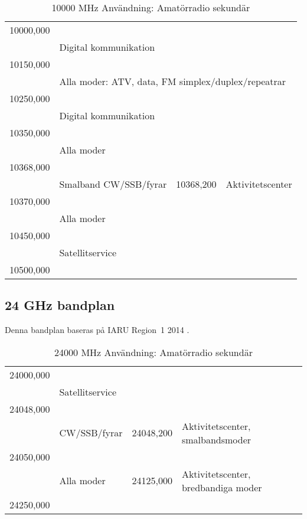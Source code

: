 \setlongtables
\begin{longtable}{llll}
\caption{10000 MHz Användning: Amatörradio sekundär} \\
10000,000 & & & \\
          & \multicolumn{3}{l}{Digital kommunikation} \\
10150,000 & & & \\
          & \multicolumn{3}{l}{Alla moder: ATV, data, FM simplex/duplex/repeatrar} \\
10250,000 & & & \\
          & \multicolumn{3}{l}{Digital kommunikation} \\
10350,000 & & & \\
          & \multicolumn{3}{l}{Alla moder} \\
10368,000 & & & \\
          & Smalband CW/SSB/fyrar & 10368,200 & Aktivitetscenter \\
10370,000 & & & \\
          & \multicolumn{3}{l}{Alla moder} \\
10450,000 & & & \\
          & \multicolumn{3}{l}{Satellitservice} \\
10500,000 & & & \\
\end{longtable}

\subsection{24 GHz bandplan}
\label{24GHzbandplan}
Denna bandplan baseras på IARU Region~1 2014 \cite{IARU1}.

\setlongtables
\begin{longtable}{llll}
\caption{24000 MHz Användning: Amatörradio sekundär} \\
24000,000 & & & \\
          & \multicolumn{3}{l}{Satellitservice} \\
24048,000 & & & \\
          & CW/SSB/fyrar & 24048,200 & Aktivitetscenter, smalbandsmoder \\
24050,000 & & & \\
          & Alla moder   & 24125,000 & Aktivitetscenter, bredbandiga moder \\
24250,000 & & & \\
\end{longtable}

\newpage

